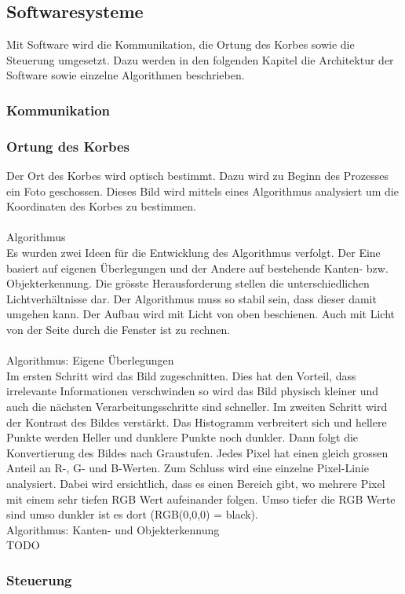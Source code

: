 \subsection{Softwaresysteme}
Mit Software wird die Kommunikation, die Ortung des Korbes sowie die Steuerung umgesetzt. Dazu werden in den folgenden Kapitel die Architektur der Software sowie einzelne Algorithmen beschrieben.

\subsubsection{Kommunikation}

\subsubsection{Ortung des Korbes}
Der Ort des Korbes wird optisch bestimmt. Dazu wird zu Beginn des Prozesses ein Foto geschossen. Dieses Bild wird mittels eines Algorithmus analysiert um die Koordinaten des Korbes zu bestimmen.\\
\\
Algorithmus\\
Es wurden zwei Ideen für die Entwicklung des Algorithmus verfolgt. Der Eine basiert auf eigenen Überlegungen und der Andere auf bestehende Kanten- bzw. Objekterkennung. Die grösste Herausforderung stellen die unterschiedlichen Lichtverhältnisse dar. Der Algorithmus muss so stabil sein, dass dieser damit umgehen kann. Der Aufbau wird mit Licht von oben beschienen. Auch mit Licht von der Seite durch die Fenster ist zu rechnen.\\
\\
Algorithmus: Eigene Überlegungen\\
Im ersten Schritt wird das Bild zugeschnitten. Dies hat den Vorteil, dass irrelevante Informationen verschwinden so wird das Bild physisch kleiner und auch die nächsten Verarbeitungsschritte sind schneller. Im zweiten Schritt wird der Kontrast des Bildes verstärkt. Das Histogramm verbreitert sich und hellere Punkte werden Heller und dunklere Punkte noch dunkler. Dann folgt die Konvertierung des Bildes nach Graustufen. Jedes Pixel hat einen gleich grossen Anteil an R-, G- und B-Werten. Zum Schluss wird eine einzelne Pixel-Linie analysiert. Dabei wird ersichtlich, dass es einen Bereich gibt, wo mehrere Pixel mit einem sehr tiefen RGB Wert aufeinander folgen. Umso tiefer die RGB Werte sind umso dunkler ist es dort (RGB(0,0,0) = black).
\\
Algorithmus: Kanten- und Objekterkennung\\
TODO

\subsubsection{Steuerung}